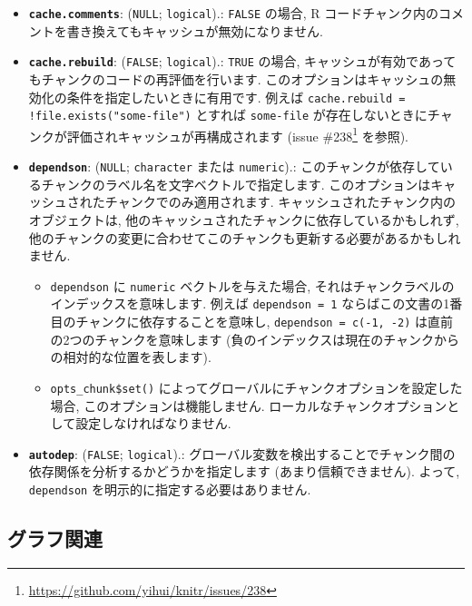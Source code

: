 \documentclass[
  11pt,
  lualatex,
  ja=standard]{bxjsreport}
\providecommand{\tightlist}{%
  \setlength{\itemsep}{0pt}\setlength{\parskip}{0pt}}
\renewcommand{\href}[2]{#2\footnote{\url{#1}}}
\begin{document}
\begin{itemize}
\item
  \textbf{\texttt{cache.comments}}: (\texttt{NULL}; \texttt{logical}).: \texttt{FALSE} の場合, R コードチャンク内のコメントを書き換えてもキャッシュが無効になりません.
\item
  \textbf{\texttt{cache.rebuild}}: (\texttt{FALSE}; \texttt{logical}).: \texttt{TRUE} の場合, キャッシュが有効であってもチャンクのコードの再評価を行います. このオプションはキャッシュの無効化の条件を指定したいときに有用です. 例えば \texttt{cache.rebuild = !file.exists("some-file")} とすれば \texttt{some-file} が存在しないときにチャンクが評価されキャッシュが再構成されます (issue \href{https://github.com/yihui/knitr/issues/238}{\#238} を参照).
\item
  \textbf{\texttt{dependson}}: (\texttt{NULL}; \texttt{character} または \texttt{numeric}).: このチャンクが依存しているチャンクのラベル名を文字ベクトルで指定します. このオプションはキャッシュされたチャンクでのみ適用されます. キャッシュされたチャンク内のオブジェクトは, 他のキャッシュされたチャンクに依存しているかもしれず, 他のチャンクの変更に合わせてこのチャンクも更新する必要があるかもしれません.

  \begin{itemize}
  \tightlist
  \item
    \texttt{dependson} に \texttt{numeric} ベクトルを与えた場合, それはチャンクラベルのインデックスを意味します. 例えば \texttt{dependson = 1} ならばこの文書の1番目のチャンクに依存することを意味し, \texttt{dependson = c(-1, -2)} は直前の2つのチャンクを意味します (負のインデックスは現在のチャンクからの相対的な位置を表します).
  \item
    \texttt{opts\_chunk\$set()} によってグローバルにチャンクオプションを設定した場合, このオプションは機能しません. ローカルなチャンクオプションとして設定しなければなりません.
  \end{itemize}
\item
  \textbf{\texttt{autodep}}: (\texttt{FALSE}; \texttt{logical}).: グローバル変数を検出することでチャンク間の依存関係を分析するかどうかを指定します (あまり信頼できません). よって, \texttt{dependson} を明示的に指定する必要はありません.
\end{itemize}

\hypertarget{plots}{%
\subsection{グラフ関連}\label{plots}}
\end{document}
